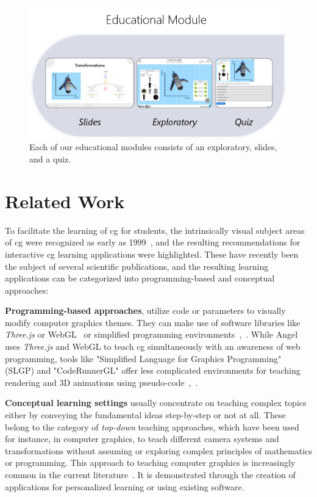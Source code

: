 \begin{figure}[tbh]
	\centering
	\includegraphics[width=0.8\linewidth]{pictures/ExGoerContents.png}
	\captionsetup{labelfont=bf,textfont=it}
	\caption[Contents of educational modules.]{Each of our educational modules consists of an exploratory, slides, and a quiz.\label{fig:contents}}
\end{figure}


\section{Related Work} %
To facilitate the learning of \acrshort{cg} for students, the intrinsically visual subject areas of \acrshort{cg} were recognized as early as 1999~\cite{Balreira:2017:topics-cg-teaching}, and the resulting recommendations for interactive \acrshort{cg} learning applications were highlighted. These have recently been the subject of several scientific publications, and the resulting learning applications can be categorized into programming-based and conceptual approaches:

\textbf{Programming-based approaches}, utilize code or parameters to visually modify computer graphics themes. They can make use of software libraries like \emph{Three.js} or WebGL~\cite{angel:2017:interactive} or simplified programming environments~\cite{Sueyasu:2010:cg-tool},~\cite{Lobb:2016:cg-tool}. While Angel~\cite{angel:2017:interactive} uses \emph{Three.js} and WebGL to teach \acrshort{cg} simultaneously with an awareness of web programming, tools like "Simplified Language for Graphics Programming" (SLGP) and "CodeRunnerGL" offer less complicated environments for teaching rendering and 3D animations using pseudo-code~\cite{Sueyasu:2010:cg-tool},~\cite{Lobb:2016:cg-tool}.

\textbf{Conceptual learning settings} usually concentrate on teaching complex topics either by conveying the fundamental ideas step-by-step or not at all. These belong to the category of \emph{top-down} teaching approaches, which have been used for instance, in computer graphics, to teach different camera systems and transformations without assuming or exploring complex principles of mathematics or programming. This approach to teaching computer graphics is increasingly common in the current literature~\cite{Suselo:2019:problems-cg-teaching}. It is demonstrated through the creation of applications for personalized learning or using existing software.

